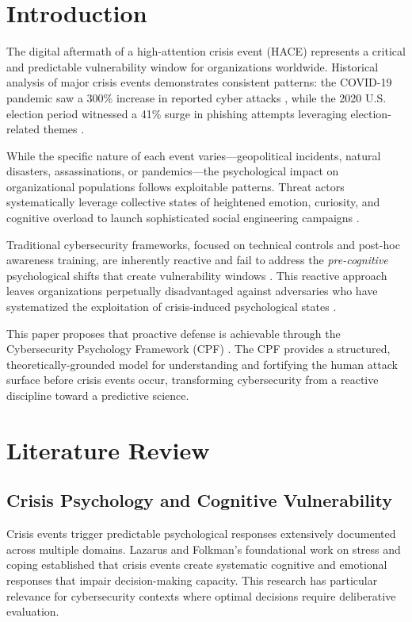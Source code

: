 \documentclass[11pt,a4paper]{article}
\begin{document}
\section{Introduction}

The digital aftermath of a high-attention crisis event (HACE) represents a critical and predictable vulnerability window for organizations worldwide. Historical analysis of major crisis events demonstrates consistent patterns: the COVID-19 pandemic saw a 300\% increase in reported cyber attacks \cite{interpol2020}, while the 2020 U.S. election period witnessed a 41\% surge in phishing attempts leveraging election-related themes \cite{proofpoint2020}.

While the specific nature of each event varies—geopolitical incidents, natural disasters, assassinations, or pandemics—the psychological impact on organizational populations follows exploitable patterns. Threat actors systematically leverage collective states of heightened emotion, curiosity, and cognitive overload to launch sophisticated social engineering campaigns \cite{verizon2023, hadnagy2018}.

Traditional cybersecurity frameworks, focused on technical controls and post-hoc awareness training, are inherently reactive and fail to address the \textit{pre-cognitive} psychological shifts that create vulnerability windows \cite{parsons2014, bulgurcu2010}. This reactive approach leaves organizations perpetually disadvantaged against adversaries who have systematized the exploitation of crisis-induced psychological states \cite{cialdini2021, mouton2016}.

This paper proposes that proactive defense is achievable through the Cybersecurity Psychology Framework (CPF) \cite{canale2025cpf}. The CPF provides a structured, theoretically-grounded model for understanding and fortifying the human attack surface before crisis events occur, transforming cybersecurity from a reactive discipline toward a predictive science.

\section{Literature Review}

\subsection{Crisis Psychology and Cognitive Vulnerability}

Crisis events trigger predictable psychological responses extensively documented across multiple domains. Lazarus and Folkman's \cite{lazarus1984} foundational work on stress and coping established that crisis events create systematic cognitive and emotional responses that impair decision-making capacity. This research has particular relevance for cybersecurity contexts where optimal decisions require deliberative evaluation.
\end{document}
